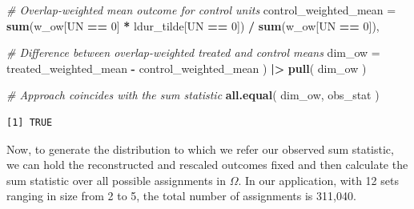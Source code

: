 \documentclass[
  12pt,
  leqno]{article}
\newenvironment{Shaded}{\begin{snugshade}}{\end{snugshade}}
\newcommand{\AttributeTok}[1]{\textcolor[rgb]{0.13,0.29,0.53}{#1}}
\newcommand{\CommentTok}[1]{\textcolor[rgb]{0.56,0.35,0.01}{\textit{#1}}}
\newcommand{\DecValTok}[1]{\textcolor[rgb]{0.00,0.00,0.81}{#1}}
\newcommand{\FunctionTok}[1]{\textcolor[rgb]{0.13,0.29,0.53}{\textbf{#1}}}
\newcommand{\NormalTok}[1]{#1}
\newcommand{\OtherTok}[1]{\textcolor[rgb]{0.56,0.35,0.01}{#1}}
\newcommand{\SpecialCharTok}[1]{\textcolor[rgb]{0.81,0.36,0.00}{\textbf{#1}}}
\newcommand{\StringTok}[1]{\textcolor[rgb]{0.31,0.60,0.02}{#1}}
\begin{document}
\begin{Shaded}
\begin{Highlighting}[]
    \CommentTok{\# Overlap{-}weighted mean outcome for control units}
    \AttributeTok{control\_weighted\_mean =}
      \FunctionTok{sum}\NormalTok{(w\_ow[UN }\SpecialCharTok{==} \DecValTok{0}\NormalTok{] }\SpecialCharTok{*}\NormalTok{ ldur\_tilde[UN }\SpecialCharTok{==} \DecValTok{0}\NormalTok{]) }\SpecialCharTok{/} \FunctionTok{sum}\NormalTok{(w\_ow[UN }\SpecialCharTok{==} \DecValTok{0}\NormalTok{]),}

    \CommentTok{\# Difference between overlap{-}weighted treated and control means}
    \AttributeTok{dim\_ow =}\NormalTok{ treated\_weighted\_mean }\SpecialCharTok{{-}}\NormalTok{ control\_weighted\_mean}
\NormalTok{  ) }\SpecialCharTok{|\textgreater{}}
  \FunctionTok{pull}\NormalTok{(}
\NormalTok{    dim\_ow}
\NormalTok{  )}

\CommentTok{\# Approach coincides with the sum statistic}
\FunctionTok{all.equal}\NormalTok{(}
\NormalTok{  dim\_ow, obs\_stat}
\NormalTok{)}
\end{Highlighting}
\end{Shaded}

\begin{verbatim}
[1] TRUE
\end{verbatim}

\doublespacing

Now, to generate the distribution to which we refer our observed sum
statistic, we can hold the reconstructed and rescaled outcomes fixed and
then calculate the sum statistic over all possible assignments in
\(\Omega\). In our application, with 12 sets ranging in size from 2 to
5, the total number of assignments is 311,040.

\singlespacing

\begin{Shaded}
\end{Shaded}
\end{document}
